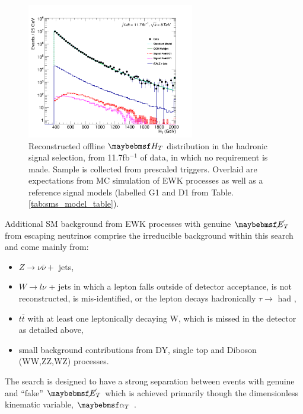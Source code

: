 \begin{figure}[!h]

\centering
\includegraphics[width=0.65\textwidth]{plots/ra1_htdistribution.pdf}
\caption[Reconstructed offline $\theht$ distribution in the hadronic signal selection, from 11.7fb$^{-1}$ of data, in which no \alphat requirement is made.]{Reconstructed offline $\theht$ distribution in the hadronic signal selection, from 11.7fb$^{-1}$ of data, in which no \alphat requirement is made. Sample is collected from prescaled \theht triggers. Overlaid are expectations from MC simulation of \ac{EWK} processes as well as a reference signal models (labelled G1 and D1 from Table.\ref{tab:sms_model_table}).}  
\label{fig:htqcdbackground}
\end{figure}

Additional \ac{SM} background from \ac{EWK} processes with genuine $\met$ from escaping neutrinos comprise the irreducible background within this search and come mainly from:

\begin{itemize}
\item $Z \rightarrow \nu\bar{\nu} +$ jets,
\item $W \rightarrow l\nu$ + jets in which a lepton falls outside of detector acceptance, is not reconstructed, is mis-identified, or the lepton decays hadronically $\tau \rightarrow$ had ,
\item $t\bar{t}$ with at least one leptonically decaying W, which is missed in the detector as detailed above,
\item small background contributions from DY, single top and Diboson (WW,ZZ,WZ) processes.
\end{itemize}

The search is designed to have a strong separation between events with genuine and ``fake'' $\met$ which is achieved primarily though the dimensionless kinematic variable, $\alphat$ \cite{alphat7tev}\cite{CMS:2008vya}.

